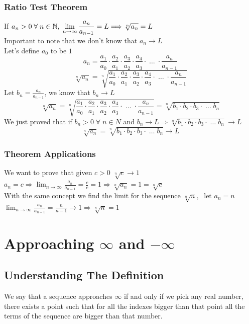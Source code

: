 \subsubsection{Ratio Test Theorem}
If $a_n>0\; \forall\; n\in \N,\; \lim_{n\to\infty} \frac{a_{n}}{a_{n-1}} = L \Longrightarrow \sqrt[n]{a_n} = L$\\
Important to note that we don't know that $a_n\rightarrow L$\\
Let's define $a_0$ to be $1$\
\[
    a_n = \frac{a_1}{a_0}\cdot \frac{a_2}{a_1}\cdot\frac{a_3}{a_2}\cdot\frac{a_4}{a_3}\cdot\;\ldots\;\cdot \frac{a_n}{a_{n-1}}
\]
\[
    \sqrt[n]{a_n} = \sqrt[n]{\frac{a_1}{a_0}\cdot \frac{a_2}{a_1}\cdot\frac{a_3}{a_2}\cdot\frac{a_4}{a_3}\cdot\;\ldots\;\cdot \frac{a_n}{a_{n-1}}}
\]
Let $b_n = \frac{a_n}{a_{n-1}}$, we know that $b_n\rightarrow L$\\
\[
    \sqrt[n]{a_n} = \sqrt[n]{\frac{a_1}{a_0}\cdot \frac{a_2}{a_1}\cdot\frac{a_3}{a_2}\cdot\frac{a_4}{a_3}\cdot\;\ldots\;\cdot \frac{a_n}{a_{n-1}}} = \sqrt[n]{b_1\cdot b_2\cdot b_3\cdot \; \ldots \;b_n}
\]
We just proved that if $b_n>0\; \forall\; n\in N$ and $b_n\rightarrow L \Longrightarrow \sqrt[n]{b_1\cdot b_2\cdot b_3\cdot \; \ldots \;b_n}\rightarrow L$
\[
    \sqrt[n]{a_n} = \sqrt[n]{b_1\cdot b_2\cdot b_3\cdot \; \ldots \;b_n}\rightarrow L
\]
\subsubsection{Theorem Applications}
We want to prove that given $c>0$ $\sqrt[n]{c} \rightarrow 1$\\
$a_n = c \Longrightarrow \lim_{n\to\infty} \frac{a_n}{a_{n-1}} = \frac{c}{c} = 1 \Longrightarrow \sqrt[n]{a_n} = 1 = \sqrt[n]{c}$\\
With the same concept we find the limit for the sequence $\sqrt[n]{n},\;$ let $a_n = n$\\
$\lim_{n\to\infty} \frac{a_n}{a_{n-1}} = \frac{n}{n-1}\rightarrow 1 \Longrightarrow \sqrt[n]{n} = 1$


\newpage
\section{Approaching $\infty$ and $-\infty$}
\subsection{Understanding The Definition}
We say that a sequence approaches $\infty$ if and only if we pick any real number, there exists a point  such that for all the indexes bigger than that point all the terms of the sequence are bigger than that number.\\

